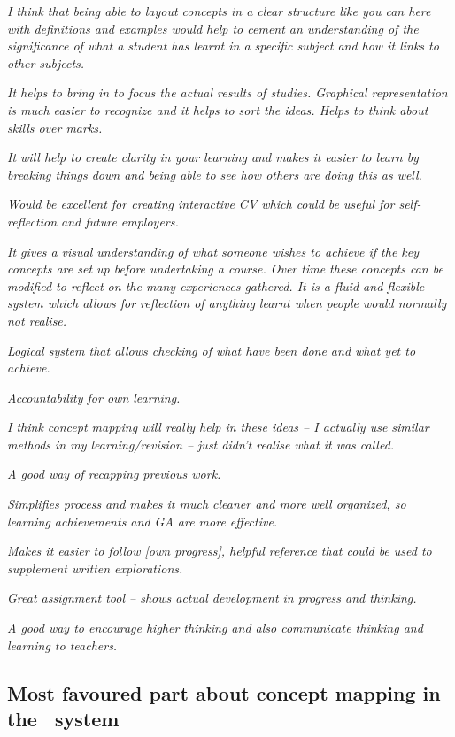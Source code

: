 \textit{I think that being able to layout concepts in a clear structure like
you can here with definitions and examples would help to cement an understanding
of the significance of what a student has learnt in a specific subject and how
it links to other subjects.}

\textit{It helps to bring in to focus the actual results of studies.
Graphical representation is much easier to recognize and it helps to sort the
ideas. Helps to think about skills over marks.}

\textit{It will help to create clarity in your learning and makes it easier
to learn by breaking things down and being able to see how others are doing this
as well.}

\textit{Would be excellent for creating interactive CV which could be useful
for self-reflection and future employers.}

\textit{It gives a visual understanding of what someone wishes to achieve if the
key concepts are set up before undertaking a course. Over time these concepts can be
modified to reflect on the many experiences gathered. It is a fluid and flexible
system which allows for reflection of anything learnt when people would normally
not realise.}

\textit{Logical system that allows checking of what have been done and what yet
to achieve.} 

\textit{Accountability for own learning.}

\textit{I think concept mapping will really help in these ideas -- I actually
use similar methods in my learning/revision -- just didn't realise what it was
called.}

\textit{A good way of recapping previous work.}

\textit{Simplifies process and makes it much cleaner and more well organized, so
learning achievements and GA are more effective.}

\textit{Makes it easier to follow [own progress], helpful reference that could
be used to supplement written explorations.}

\textit{Great assignment tool -- shows actual development in progress and
thinking.}

\textit{A good way to encourage higher thinking and also communicate thinking
and learning to teachers.}


\subsection{Most favoured part about concept mapping in the \ep~system}

